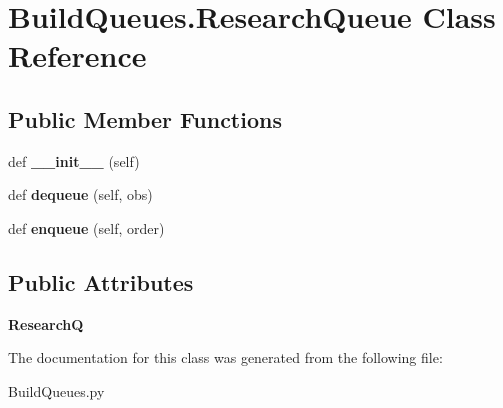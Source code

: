 \hypertarget{classBuildQueues_1_1ResearchQueue}{}\section{Build\+Queues.\+Research\+Queue Class Reference}
\label{classBuildQueues_1_1ResearchQueue}
\subsection*{Public Member Functions}
\begin{DoxyCompactItemize}
\item 
def {\bfseries \+\_\+\+\_\+init\+\_\+\+\_\+} (self)\hypertarget{classBuildQueues_1_1ResearchQueue_ad67c60d85072de34bc3ad9076b377bc7}{}\label{classBuildQueues_1_1ResearchQueue_ad67c60d85072de34bc3ad9076b377bc7}

\item 
def {\bfseries dequeue} (self, obs)\hypertarget{classBuildQueues_1_1ResearchQueue_ac1929cc39d97f4ed8f59b6d6955b3765}{}\label{classBuildQueues_1_1ResearchQueue_ac1929cc39d97f4ed8f59b6d6955b3765}

\item 
def {\bfseries enqueue} (self, order)\hypertarget{classBuildQueues_1_1ResearchQueue_af19964b54839fc541ab4201f11d1aedd}{}\label{classBuildQueues_1_1ResearchQueue_af19964b54839fc541ab4201f11d1aedd}

\end{DoxyCompactItemize}
\subsection*{Public Attributes}
\begin{DoxyCompactItemize}
\item 
{\bfseries ResearchQ}\hypertarget{classBuildQueues_1_1ResearchQueue_a4bba8914e159a171e3b18d19c3db632c}{}\label{classBuildQueues_1_1ResearchQueue_a4bba8914e159a171e3b18d19c3db632c}

\end{DoxyCompactItemize}


The documentation for this class was generated from the following file\+:\begin{DoxyCompactItemize}
\item 
Build\+Queues.\+py\end{DoxyCompactItemize}

